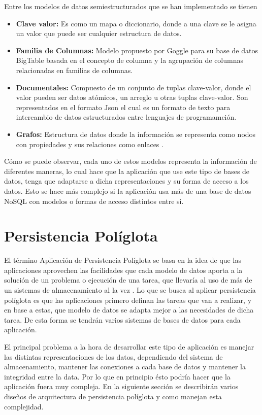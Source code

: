 \documentclass[conference]{IEEEtran}
\begin{document}
Entre los modelos de datos semiestructurados que se han implementado se tienen
\begin{itemize}
\item \textbf{Clave valor:} Es como un mapa o diccionario, donde a una clave se le asigna un valor que puede ser cualquier estructura de datos.
\item \textbf{Familia de Columnas:} Modelo propuesto por Goggle para su base de datos BigTable \cite{BigTable} basada en el concepto de columna y la agrupación de columnas relacionadas en familias de columnas.
\item \textbf{Documentales:} Compuesto de un conjunto de tuplas clave-valor, donde el valor pueden ser datos atómicos, un arreglo u otras tuplas clave-valor. Son representados en el formato Json \cite{Json} el cual es un formato de texto para intercambio de datos estructurados entre lenguajes de programamci\'on.
\item \textbf{Grafos:} Estructura de datos donde la información se representa como nodos con propiedades y sus relaciones como enlaces \cite{neo}.
\end{itemize}

C\'omo se puede observar, cada uno de estos modelos representa la información de diferentes maneras, lo cual hace que la aplicación que use este tipo de bases de datos, tenga que adaptarse a dicha representaciones y su forma de acceso a los datos. Esto se hace m\'as complejo si la aplicaci\'on usa más de una base de datos NoSQL con modelos o formas de acceso distintos entre si. 


\section{Persistencia Pol\'iglota}


El t\'ermino Aplicaci\'on de Persistencia Pol\'iglota se basa en la idea de que las aplicaciones aprovechen las facilidades que cada modelo de datos aporta a la solución de un problema o ejecución de una tarea, que llevaría al uso de más de un sistemas de almacenamiento al la vez \cite{persistenciaPoliglota}. Lo que se busca al aplicar persistencia pol\'iglota es que las aplicaciones primero definan las tareas que van a realizar, y en base a estas, que modelo de datos se adapta mejor a las necesidades de dicha tarea. De esta forma se tendr\'an varios sistemas de bases de datos para cada aplicaci\'on. 

El principal problema a la hora de desarrollar este tipo de aplicaci\'on es manejar las distintas representaciones de los datos, dependiendo del sistema de almacenamiento, mantener las conexiones a cada base de datos y mantener la integridad entre la data. Por lo que en principio \'esto podr\'ia hacer que la aplicaci\'on fuera muy compleja. En la siguiente secci\'on se describir\'an varios diseños de arquitectura de persistencia pol\'iglota y como manejan esta complejidad.
\end{document}

